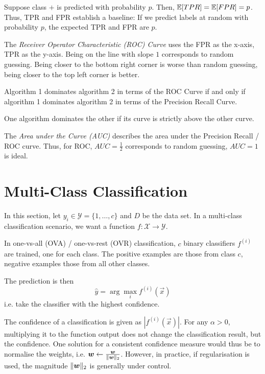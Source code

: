 Suppose class $+$ is predicted with probability $p$.
Then, $\mathbb{E}[TPR] = \mathbb{E}[FPR] = p$.
Thus, TPR and FPR establish a baseline:
If we predict labels at random with probability $p$,
the expected TPR and FPR are $p$.

The \emph{Receiver Operator Characteristic (ROC) Curve}
uses the FPR as the x-axis, TPR as the y-axis.
Being on the line with slope $1$ corresponds to random
guessing. Being closer to the bottom right corner is worse
than random guessing, being closer to the top left corner
is better.

\begin{theorem}
	Algorithm 1 dominates algorithm 2 in terms of the
	ROC Curve if and only if
	algorithm 1 dominates algorithm 2 in terms of the
	Precision Recall Curve.
	
	One algorithm dominates the other if its curve
	is strictly above the other curve.
\end{theorem}

The \emph{Area under the Curve (AUC)} describes the
area under the Precision Recall / ROC curve.
Thus, for ROC, $AUC = \frac{1}{2}$ corresponds to random
guessing, $AUC = 1$ is ideal.


\section{Multi-Class Classification}
In this section, let $y_i \in \mathcal{Y} = \{1, \dotsc, c\}$
and $D$ be the data set.
In a multi-class classification scenario,
we want a function $f : \mathcal{X} \to \mathcal{Y}$.

In one-vs-all (OVA) / one-vs-rest (OVR) classification,
$c$ binary classifiers $f^{(i)}$ are trained,
one for each class.
The positive examples are those from class $c$,
negative examples those from all other classes.

The prediction is then
\begin{equation*}
\hat{y} = \arg\max_i f^{(i)}(\vec{x})
\end{equation*}
i.e. take the classifier with the highest confidence.

The confidence of a classification is given as
$|f^{(i)}(\vec{x})|$.
For any $\alpha > 0$, multiplying it to the function output
does not change the classification result, but the confidence.
One solution for a consistent confidence measure would thus be
to normalise the weights,
i.e. $\boldsymbol{w} \gets \frac{\boldsymbol{w}}{\lVert\boldsymbol{w}\rVert_2}$.
However, in practice, if regularisation is used,
the magnitude $\lVert\boldsymbol{w}\rVert_2$ is generally under control.


